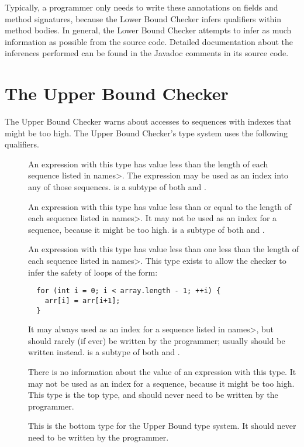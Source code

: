 Typically, a programmer only needs to write these annotations on
fields and method signatures, because the Lower Bound Checker infers
qualifiers within method bodies.
In general, the Lower Bound Checker attempts to infer as much information
as possible from the source code.
Detailed documentation about the inferences performed can be found
in the Javadoc comments in its source code.


\section{The Upper Bound Checker\label{index-upperbound}}

The Upper Bound Checker warns about accesses to sequences with indexes that might be
too high.
The Upper Bound Checker's type system uses the following qualifiers.

\begin{description}
\item[]
  An expression with this type
  has value less than the length of each sequence listed in \<names>.
  The expression may be used as an index into any of those sequences.
   is a subtype of both
   and .
\item[]
  An expression with this type
  has value less than or equal to the length of each sequence listed in \<names>.
  It may not be used as an index for a sequence, because it might be too high.
   is a subtype of both
   and .
\item[]
  An expression with this type
  has value less than one less than the length of each sequence listed in \<names>. This type exists to allow the checker to infer the safety of loops of
  the form:
\begin{Verbatim}
  for (int i = 0; i < array.length - 1; ++i) {
    arr[i] = arr[i+1];
  }
\end{Verbatim}
It may always used as an index for a sequence listed in \<names>, but
should rarely (if ever) be written by the programmer; usually
should be written instead.
   is a subtype of both
   and .
\item[]
  There is no information about the value of an expression with this type.
  It may not be used as an index for a sequence, because it might be too high.
  This type is the top type, and should never need to be written by the
  programmer.
\item[]
  This is the bottom type for the Upper Bound type system. It should
  never need to be written by the programmer.
  \end{description}

